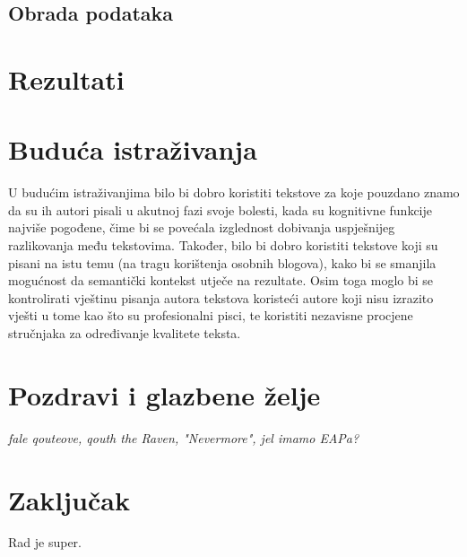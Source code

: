 \documentclass[10pt, a4paper]{article}
\begin{document}
\subsection{Obrada podataka}

\section{Rezultati}

\section{Buduća istraživanja}
U budućim istraživanjima bilo bi dobro koristiti tekstove za koje pouzdano znamo da su ih autori pisali u akutnoj fazi svoje bolesti, kada su kognitivne funkcije najviše pogođene, čime bi se povećala izglednost dobivanja uspješnijeg razlikovanja među tekstovima. Također, bilo bi dobro koristiti tekstove koji su pisani na istu temu (na tragu korištenja osobnih blogova), kako bi se smanjila mogućnost da semantički kontekst utječe na rezultate. Osim toga moglo bi se kontrolirati vještinu pisanja autora tekstova koristeći autore koji nisu izrazito vješti u tome kao što su profesionalni pisci, te koristiti nezavisne procjene stručnjaka za određivanje kvalitete teksta.


\section{Pozdravi i glazbene želje}

\emph{fale qouteove, qouth the Raven, "Nevermore", jel imamo EAPa?}



\section{Zaključak}

Rad je super.




 
\end{document}
